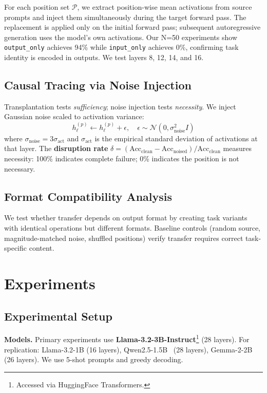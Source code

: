 \documentclass[sigconf,anonymous]{acmart}
\begin{document}
For each position set $\mathcal{P}$, we extract position-wise mean activations from source prompts and inject them simultaneously during the target forward pass. The replacement is applied only on the initial forward pass; subsequent autoregressive generation uses the model's own activations. Our N=50 experiments show \texttt{output\_only} achieves 94\% while \texttt{input\_only} achieves 0\%, confirming task identity is encoded in outputs. We test layers 8, 12, 14, and 16.

\subsection{Causal Tracing via Noise Injection}

Transplantation tests \emph{sufficiency}; noise injection tests \emph{necessity}. We inject Gaussian noise scaled to activation variance:
\begin{equation}
h_\ell^{(p)} \leftarrow h_\ell^{(p)} + \epsilon, \quad \epsilon \sim \mathcal{N}(0, \sigma_\text{noise}^2 I)
\end{equation}
where $\sigma_\text{noise} = 3\sigma_\text{act}$ and $\sigma_\text{act}$ is the empirical standard deviation of activations at that layer. The \textbf{disruption rate} $\delta = (\text{Acc}_{\text{clean}} - \text{Acc}_{\text{noised}}) / \text{Acc}_{\text{clean}}$ measures necessity: 100\% indicates complete failure; 0\% indicates the position is not necessary.

\subsection{Format Compatibility Analysis}

We test whether transfer depends on output format by creating task variants with identical operations but different formats. Baseline controls (random source, magnitude-matched noise, shuffled positions) verify transfer requires correct task-specific content.

\section{Experiments}
\label{sec:experiments}

\subsection{Experimental Setup}

\textbf{Models.} Primary experiments use \textbf{Llama-3.2-3B-Instruct}\footnote{Accessed via HuggingFace Transformers.} (28 layers). For replication: Llama-3.2-1B (16 layers), Qwen2.5-1.5B~\cite{bai2023qwen} (28 layers), Gemma-2-2B~\cite{team2024gemma} (26 layers). We use 5-shot prompts and greedy decoding.
\end{document}
